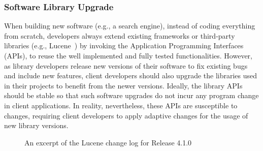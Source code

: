 \documentclass[runningheads,a4paper]{llncs}
\begin{document}
\subsubsection{Software Library Upgrade} 
When building new software (e.g., a search engine), instead of coding everything from scratch, developers always extend existing frameworks or third-party libraries (e.g., Lucene~\cite{lucene}) by invoking the Application Programming Interfaces (APIs), to reuse the well implemented and fully tested functionalities. However, as library developers release new versions of their software to fix existing bugs and include new features, client developers should also upgrade the libraries used in their projects to benefit from the newer versions. Ideally, the library APIs should be stable so that such software upgrades do not incur any program change in client applications. In reality, nevertheless, these APIs are susceptible to changes, requiring client developers to apply adaptive changes for the usage of new library versions. 

\begin{figure}
\centering
{}
\caption{An excerpt of the Lucene change log for Release 4.1.0~\cite{releasenote}}
\label{fig:releasenote}
\end{figure}
\end{document}
